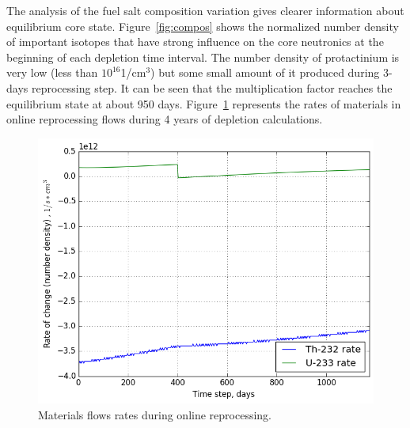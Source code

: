 \documentclass{anstrans}
\begin{document}
The analysis of the fuel salt composition variation gives clearer information 
about equilibrium core state. Figure~\ref{fig:compos} shows the normalized 
number density of important isotopes that have strong influence on the core 
neutronics at the beginning of each depletion time interval. The number density 
of protactinium is very low (less than $10^{16}$1/cm$^3$) but some small amount 
of it produced during 3-days reprocessing step. It can be seen that the 
multiplication factor reaches the equilibrium state at about 950  days. 
Figure~\ref{fig:rates} represents the rates of materials in online reprocessing 
flows during 4 years of depletion calculations. 
\begin{figure}[hb] %
        \centering
        \vspace{-0.8em}
        \includegraphics[width=1.03\linewidth]{rates_fuel.png}
        \caption{Materials flows rates during online reprocessing.}
        \label{fig:rates}
        \vspace{-0.8em}
\end{figure}
\end{document}
